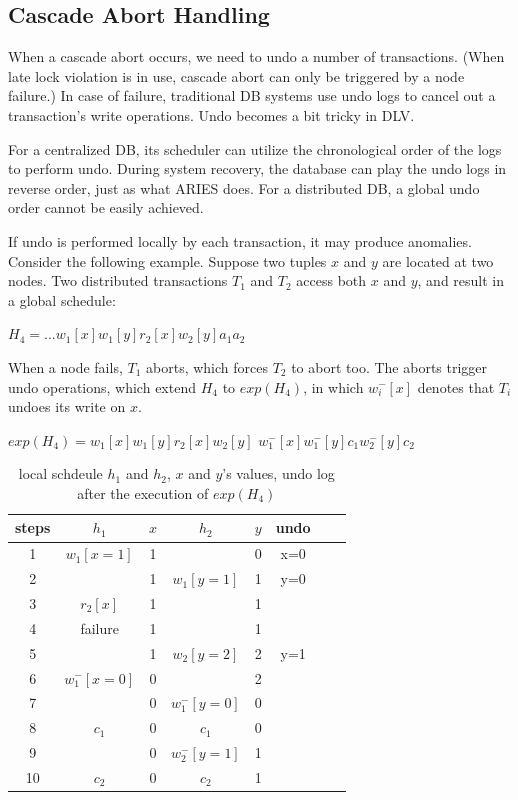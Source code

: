 \documentclass[conference]{IEEEtran}
\begin{document}
\subsection{Cascade Abort Handling}
When a cascade abort occurs,
we need to undo a number of transactions.
(When late lock violation is in use, cascade abort can only be triggered by a node failure.)
In case of failure, traditional DB systems use undo logs to cancel out a transaction's write operations.
Undo becomes a bit tricky in DLV.

For a centralized DB, its scheduler can utilize the chronological order of the logs to perform undo.
During system recovery, the database can play the undo logs in reverse order, just as what ARIES does.
For a distributed DB, a global undo order cannot be easily achieved.

If undo is performed locally by each transaction, it may produce anomalies.
Consider the following example. Suppose two tuples $x$ and $y$ are located at two nodes.
Two distributed transactions $T_1$ and $T_2$ access both $x$ and $y$, and result in a global schedule:

\begin{center}
${H_4 = ...w_1[x]w_1[y]r_2[x]w_2[y]a_1a_2}$
\end{center}

When a node fails, ${T_1}$ aborts, which forces ${T_2}$ to abort too.
The aborts trigger undo operations, which extend ${H_4}$ to ${exp(H_4)}$,
in which ${w^-_i[x]}$ denotes that ${T_i}$ undoes its write on ${x}$.

\begin{center}
  ${exp(H_4) =  w_1[x]w_1[y]r_2[x] w_2[y]}$
  ${w^-_1[x]w^-_1[y]  c_1 w^-_2[y]c_2}$
\end{center}


\begin{table}[tbp]
  \centering
  \caption{local schdeule $h_1$ and $h_2$, $x$ and $y$'s values, undo log after the execution of ${exp(H_4)}$}
  \begin{tabular}{|c|c|c|c|c|c|c|c|}
  \hline
steps & $h_1$ & $x$ & $h_2$ & $y$ & undo   \\
  \hline
  \hline
 1& $w_1[x=1]$ & 1 & &  0 & x=0  \\
  \hline
  2& & 1 & $w_1[y=1]$ & 1 & y=0   \\
  \hline
3 & $r_2[x]$ & 1 & & 1 &    \\

  \hline
 4 & failure  & 1 & & 1 &  \\
  \hline
 5& & 1 &   $w_2[y=2]$ & 2 & y=1  \\
  \hline
6  & $w^-_1[x=0]$ & 0 && 2 &   \\
  \hline
7 & & 0 & $w^-_1[y=0]$ & 0 &   \\
  \hline


8  & $c_1$ & 0 &$c_1$& 0 &   \\
  \hline
9 & & 0 &  $w^-_2[y=1]$& 1 &   \\
  \hline
10 & $c_2$ & 0 &$c_2$& 1 &  \\
  \hline
  \end{tabular}

\label{tbl:x_y_vlues}
\end{table}
\end{document}
